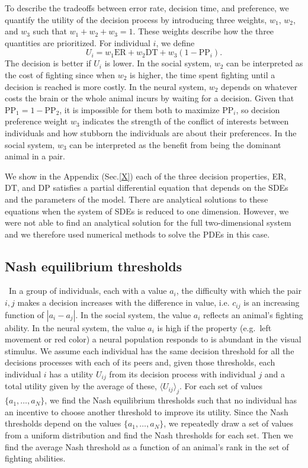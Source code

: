 \documentclass{article}
\begin{document}
To describe the tradeoffs between error rate, decision time, and preference, we quantify the utility of the decision process by introducing three weights, $w_1$, $w_2$, and $w_3$ such that $w_1+w_2+w_3=1$.  These weights describe how the three quantities are prioritized.  For individual $i$, we define
\begin{equation*}
U_{i}=w_1\text{ER}+w_2\text{DT}+w_3(1-\text{PP}_i).
\end{equation*}
The decision is better if $U_i$ is lower.  In the social system, $w_2$ can be interpreted as the cost of fighting since when $w_2$ is higher, the time spent fighting until a decision is reached is more costly.  In the neural system, $w_2$ depends on whatever costs the brain or the whole animal incurs by waiting for a decision. Given that $\text{PP}_1=1-\text{PP}_2$, it is impossible for them both to maximize $\text{PP}_i$, so decision preference weight $w_3$ indicates the strength of the conflict of interests between individuals and how stubborn the individuals are about their preferences. In the social system, $w_3$ can be interpreted as the benefit from being the dominant animal in a pair.

We show in the Appendix (Sec.\ref{X}) each of the three decision properties, ER, DT, and DP satisfies a partial differential equation that depends on the SDEs and the parameters of the model. There are analytical solutions to these equations when the system of SDEs is reduced to one dimension. However, we were not able to find an analytical solution for the full two-dimensional system and we therefore used numerical methods to solve the PDEs in this case.

\subsection*{Nash equilibrium thresholds }
\ In a group of individuals, each with a value $a_i$, the difficulty with which the pair $i,j$ makes a decision increases with the difference in value, i.e. $c_{ij}$ is an increasing function of $|a_i-a_j|$. In the social system, the value $a_i$ reflects an animal's fighting ability. In the neural system, the value $a_i$ is high if the property (e.g.\ left movement or red color) a neural population responds to is abundant in the visual stimulus. We assume each individual has the same decision threshold for all the decisions processes with each of its peers and, given those thresholds, each individual $i$ has a utility $U_{ij}$ from its decision process with individual $j$ and a total utility given by the average of these, $\langle U_{ij}\rangle _j$. For each set of values $\{a_1,\dots,a_N\}$, we find the Nash equilibrium thresholds such that no individual has an incentive to choose another threshold to improve its utility.  Since the Nash thresholds depend on the values $\{a_1,\dots,a_N\}$,  we repeatedly draw a set of values from a uniform distribution and find the Nash thresholds for each set. Then we find the average Nash threshold as a function of an animal's rank in the set of fighting abilities.    
\end{document}
